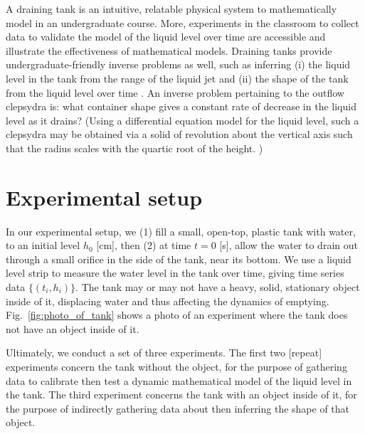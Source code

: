 \documentclass[openacc]{rsproca_new}%
\begin{document}

A draining tank is an intuitive, relatable physical system to mathematically model in an undergraduate course. 
More, experiments in the classroom to collect data to validate the model of the liquid level over time are accessible and illustrate the effectiveness of mathematical models.
\cite{farmer1992physical,driver1998torricelli,brady2009siphons,rother2024modelling,paldy1963apparatus,ivanov2014testing,williams2021vessel,pavesi2019investigating,planinvsivc2011holes,saleta2005experimental,lopac2015water}
Draining tanks provide undergraduate-friendly inverse problems \cite{groetsch1993inverse,neto2012introduction,tarantola2005inverse} as well, such as inferring (i) the liquid level in the tank from the range of the liquid jet and (ii) the shape of the tank from the liquid level over time \cite{groetsch1993inverse,groetsch1999inverse}. 
An inverse problem pertaining to the outflow clepsydra is: what container shape gives a constant rate of decrease in the liquid level as it drains?
(Using a differential equation model for the liquid level, such a clepsydra may be obtained via a solid of revolution about the vertical axis such that the radius scales with the quartic root of the height. \cite{mills1982newton,d2021torricelli})


\section{Experimental setup}
In our experimental setup, we (1) fill a small, open-top, plastic tank with water, to an initial level $h_0$ [cm], then (2) at time $t=0$ [s], allow the water to drain out through a small orifice in the side of the tank, near its bottom. 
We use a liquid level strip to measure the water level in the tank over time, giving time series data $\{(t_i, h_i)\}$. The tank may or may not have a heavy, solid, stationary object inside of it, displacing water and thus affecting the dynamics of emptying. Fig.~\ref{fig:photo_of_tank} shows a photo of an experiment where the tank does not have an object inside of it.

Ultimately, we conduct a set of three experiments. The first two [repeat] experiments concern the tank without the object, for the purpose of gathering data to calibrate then test a dynamic mathematical model of the liquid level in the tank. The third experiment concerns the tank with an object inside of it, for the purpose of indirectly gathering data about then inferring the shape of that object.
\end{document}
